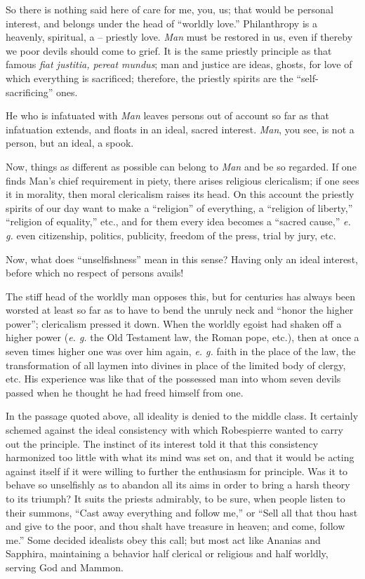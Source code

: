 \documentclass[12pt,a4paper]{book}
\begin{document}
So there is nothing said here of care for me, you, us; that would be personal 
interest, and belongs under the head of ``worldly love.'' Philanthropy is a 
heavenly, spiritual, a -- priestly love. \textit{Man} must be restored in us, 
even if thereby we poor devils should come to grief. It is the same priestly 
principle as that famous \textit{fiat justitia, pereat mundus}; man and 
justice are ideas, ghosts, for love of which everything is sacrificed; 
therefore, the priestly spirits are the ``self-sacrificing'' ones.

He who is infatuated with \textit{Man} leaves persons out of account so far as 
that infatuation extends, and floats in an ideal, sacred interest. 
\textit{Man}, you see, is not a person, but an ideal, a spook.

Now, things as different as possible can belong to \textit{Man} and be so 
regarded. If one finds Man's chief requirement in piety, there arises 
religious clericalism; if one sees it in morality, then moral clericalism 
raises its head. On this account the priestly spirits of our day want to make 
a ``religion'' of everything, a ``religion of liberty,'' ``religion of 
equality,'' etc., and for them every idea becomes a ``sacred cause,'' 
\textit{e. g.} even citizenship, politics, publicity, freedom of the press, 
trial by jury, etc.

Now, what does ``unselfishness'' mean in this sense? Having only an ideal 
interest, before which no respect of persons avails!

The stiff head of the worldly man opposes this, but for centuries has always 
been worsted at least so far as to have to bend the unruly neck and ``honor 
the higher power''; clericalism pressed it down. When the worldly egoist had 
shaken off a higher power (\textit{e. g.} the Old Testament law, the Roman 
pope, etc.), then at once a seven times higher one was over him again, 
\textit{e. g.} faith in the place of the law, the transformation of all laymen 
into divines in place of the limited body of clergy, etc. His experience was 
like that of the possessed man into whom seven devils passed when he thought 
he had freed himself from one.

In the passage quoted above, all ideality is denied to the middle class. It 
certainly schemed against the ideal consistency with which Robespierre wanted 
to carry out the principle. The instinct of its interest told it that this 
consistency harmonized too little with what its mind was set on, and that it 
would be acting against itself if it were willing to further the enthusiasm 
for principle. Was it to behave so unselfishly as to abandon all its aims in 
order to bring a harsh theory to its triumph? It suits the priests admirably, 
to be sure, when people listen to their summons, ``Cast away everything and 
follow me,'' or ``Sell all that thou hast and give to the poor, and thou 
shalt have treasure in heaven; and come, follow me.'' Some decided idealists 
obey this call; but most act like Ananias and Sapphira, maintaining a behavior 
half clerical or religious and half worldly, serving God and Mammon.
\end{document}
